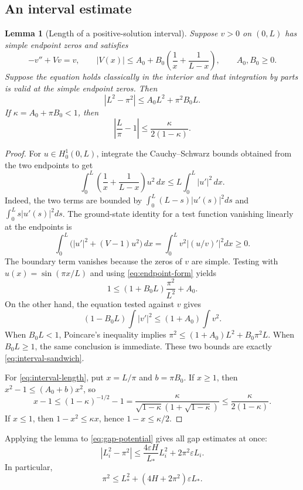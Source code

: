 \documentclass[11pt,reqno]{amsart}
\numberwithin{equation}{section}
\newtheorem{lemma}[theorem]{Lemma}
\theoremstyle{definition}
\theoremstyle{remark}
\begin{document}
\subsection{An interval estimate}
\begin{lemma}[Length of a positive-solution interval]\label{lem:interval}
Suppose $v>0$ on $(0,L)$ has simple endpoint zeros and satisfies
\[
-v''+Vv=v,\qquad |V(x)|\le A_0+B_0\left(\frac1x+\frac1{L-x}\right),\qquad A_0,B_0\ge0.
\]
Suppose the equation holds classically in the interior and that integration by parts is valid at the simple endpoint zeros. Then
\begin{equation}\label{eq:interval-sandwich}
|L^2-\pi^2|\le A_0L^2+\pi^2B_0L.
\end{equation}
If $\kappa=A_0+\pi B_0<1$, then
\begin{equation}\label{eq:interval-length}
\left|\frac L\pi-1\right|\le\frac{\kappa}{2(1-\kappa)}.
\end{equation}
\end{lemma}
\begin{proof}
For $u\in H^1_0(0,L)$, integrate the Cauchy--Schwarz bounds obtained from the two endpoints to get
\begin{equation}\label{eq:endpoint-form}
\int_0^L\left(\frac1x+\frac1{L-x}\right)u^2\,dx
\le L\int_0^L|u'|^2\,dx.
\end{equation}
Indeed, the two terms are bounded by $\int_0^L(L-s)|u'(s)|^2ds$ and $\int_0^Ls|u'(s)|^2ds$.
The ground-state identity for a test function vanishing linearly at the endpoints is
\[
\int_0^L\bigl(|u'|^2+(V-1)u^2\bigr)\,dx
=\int_0^Lv^2\left|(u/v)'\right|^2dx\ge0.
\]
The boundary term vanishes because the zeros of $v$ are simple. Testing with $u(x)=\sin(\pi x/L)$ and using \eqref{eq:endpoint-form} yields
\[
1\le (1+B_0L)\frac{\pi^2}{L^2}+A_0.
\]
On the other hand, the equation tested against $v$ gives
\[
(1-B_0L)\int|v'|^2\le(1+A_0)\int v^2.
\]
When $B_0L<1$, Poincare's inequality implies
$\pi^2\le(1+A_0)L^2+B_0\pi^2L$. When $B_0L\ge1$, the same conclusion is immediate. These two bounds are exactly \eqref{eq:interval-sandwich}.

For \eqref{eq:interval-length}, put $x=L/\pi$ and $b=\pi B_0$. If $x\ge1$, then
$x^2-1\le(A_0+b)x^2$, so
\[
x-1\le(1-\kappa)^{-1/2}-1
=\frac{\kappa}{\sqrt{1-\kappa}(1+\sqrt{1-\kappa})}
\le\frac{\kappa}{2(1-\kappa)}.
\]
If $x\le1$, then $1-x^2\le\kappa x$, hence $1-x\le\kappa/2$.
\end{proof}

Applying the lemma to \eqref{eq:gap-potential} gives all gap estimates at once:
\begin{equation}\label{eq:all-gaps}
 |L_i^2-\pi^2|\le\frac{4\varepsilon H}{L_*}L_i^2+2\pi^2\varepsilon L_i.
\end{equation}
In particular,
\begin{equation}\label{eq:least-gap}
 \pi^2\le L_*^2+(4H+2\pi^2)\varepsilon L_*.
\end{equation}
\end{document}
